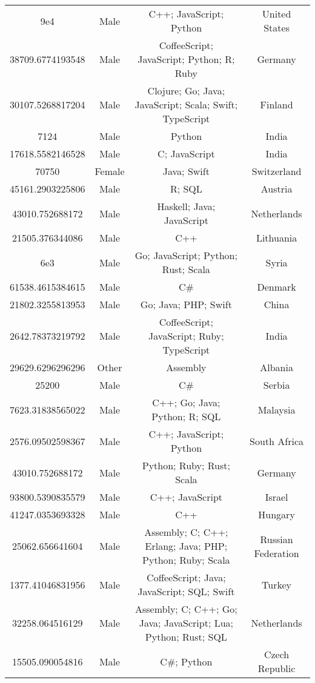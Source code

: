 \begin{center}
\begin{tabular}{ |c|c|c|c| }
9e4  &  Male  &  C++; JavaScript; Python  &  United States  \\ 
38709.6774193548  &  Male  &  CoffeeScript; JavaScript; Python; R; Ruby  &  Germany  \\ 
30107.5268817204  &  Male  &  Clojure; Go; Java; JavaScript; Scala; Swift; TypeScript  &  Finland  \\ 
7124  &  Male  &  Python  &  India  \\ 
17618.5582146528  &  Male  &  C; JavaScript  &  India  \\ 
70750  &  Female  &  Java; Swift  &  Switzerland  \\ 
45161.2903225806  &  Male  &  R; SQL  &  Austria  \\ 
43010.752688172  &  Male  &  Haskell; Java; JavaScript  &  Netherlands  \\ 
21505.376344086  &  Male  &  C++  &  Lithuania  \\ 
6e3  &  Male  &  Go; JavaScript; Python; Rust; Scala  &  Syria  \\ 
61538.4615384615  &  Male  &  C\#  &  Denmark  \\ 
21802.3255813953  &  Male  &  Go; Java; PHP; Swift  &  China  \\ 
2642.78373219792  &  Male  &  CoffeeScript; JavaScript; Ruby; TypeScript  &  India  \\ 
29629.6296296296  &  Other  &  Assembly  &  Albania  \\ 
25200  &  Male  &  C\#  &  Serbia  \\ 
7623.31838565022  &  Male  &  C++; Go; Java; Python; R; SQL  &  Malaysia  \\ 
2576.09502598367  &  Male  &  C++; JavaScript; Python  &  South Africa  \\ 
43010.752688172  &  Male  &  Python; Ruby; Rust; Scala  &  Germany  \\ 
93800.5390835579  &  Male  &  C++; JavaScript  &  Israel  \\ 
41247.0353693328  &  Male  &  C++  &  Hungary  \\ 
25062.656641604  &  Male  &  Assembly; C; C++; Erlang; Java; PHP; Python; Ruby; Scala  &  Russian Federation  \\ 
1377.41046831956  &  Male  &  CoffeeScript; Java; JavaScript; SQL; Swift  &  Turkey  \\ 
32258.064516129  &  Male  &  Assembly; C; C++; Go; Java; JavaScript; Lua; Python; Rust; SQL  &  Netherlands  \\ 
15505.090054816  &  Male  &  C\#; Python  &  Czech Republic  \\ 

\end{tabular}
\end{center}
